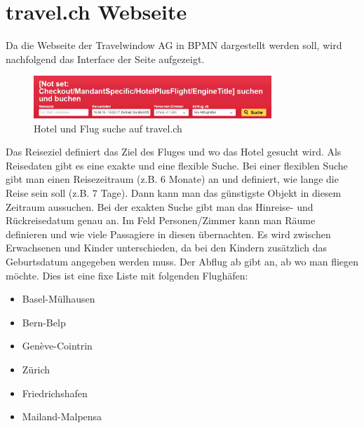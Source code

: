 \section{travel.ch Webseite}
\label{sec:recherche:travelch}
Da die Webseite der Travelwindow AG in BPMN dargestellt werden soll, wird nachfolgend das Interface der Seite aufgezeigt.
\begin{figure}[H]
	\centering
	\includegraphics[width=0.8\textwidth]{images/travel-search.png}
	\caption{Hotel und Flug suche auf travel.ch}
	\label{fig:recherche:travelch:search}
\end{figure}
Das Reiseziel definiert das Ziel des Fluges und wo das Hotel gesucht wird. Als Reisedaten gibt es eine exakte und eine flexible Suche. Bei einer flexiblen Suche gibt man einen Reisezeitraum (z.B. 6 Monate) an und definiert, wie lange die Reise sein soll (z.B. 7 Tage). Dann kann man das günstigste Objekt in diesem Zeitraum aussuchen. Bei der exakten Suche gibt man das Hinreise- und Rückreisedatum genau an.
Im Feld Personen/Zimmer kann man Räume definieren und wie viele Passagiere in diesen übernachten. Es wird zwischen Erwachsenen und Kinder unterschieden, da bei den Kindern zusätzlich das Geburtsdatum angegeben werden muss. Der Abflug ab gibt an, ab wo man fliegen möchte. Dies ist eine fixe Liste mit folgenden Flughäfen:
\begin{itemize}
\item Basel-Mülhausen
\item Bern-Belp
\item Genève-Cointrin
\item Zürich
\item Friedrichshafen
\item Mailand-Malpensa
\end{itemize}

